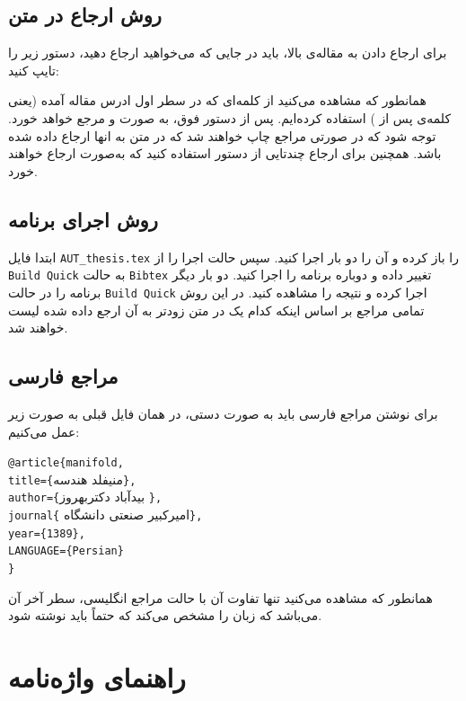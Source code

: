 \subsection{روش ارجاع در متن}
برای ارجاع دادن به مقاله‌ی بالا، باید در جایی که می‌خواهید ارجاع دهید، دستور زیر را تایپ کنید:
\begin{latin}
\end{latin}
همانطور که مشاهده می‌کنید از کلمه‌ای که در سطر اول ادرس مقاله آمده (یعنی کلمه‌ی پس از
)
استفاده کرده‌ایم. پس از دستور فوق، به صورت \cite{bidabad2007classification} و \cite{aa} مرجع خواهد خورد. توجه شود که در صورتی مراجع چاپ خواهند شد که در متن به انها ارجاع داده شده باشد. همچنین برای ارجاع چندتایی از دستور 
استفاده کنید که به‌صورت \cite{najafi2008finsler, zakeri, najafi} ارجاع خواهند خورد.
\subsection{روش اجرای برنامه}
ابتدا فایل
\verb;AUT_thesis.tex;
را باز کرده و آن را دو بار اجرا کنید. سپس حالت اجرا را از 
\verb;Build Quick;
به حالت
\verb;Bibtex;
تغییر داده و دوباره برنامه را اجرا کنید. دو بار دیگر برنامه را در حالت 
\verb;Build Quick;
اجرا کرده و نتیجه را مشاهده کنید. در این روش تمامی مراجع بر اساس اینکه کدام یک در متن زودتر به آن ارجع داده شده لیست خواهند شد.
\subsection{مراجع فارسی}
برای نوشتن مراجع فارسی باید به صورت دستی، در همان فایل قبلی به صورت زیر عمل می‌کنیم:
\begin{LTR}
\noindent\verb;@article{manifold,;\\
\verb;title={;منیفلد هندسه\verb;},;\\
\verb;author={;بیدآباد دکتربهروز \verb;},;\\
\verb;journal{; امیرکبیر صنعتی دانشگاه\verb;},;\\
\verb;year={1389},;\\
\verb;LANGUAGE={Persian};\\
\verb;};
\end{LTR}
همانطور که مشاهده می‌کنید تنها تفاوت آن با حالت مراجع انگلیسی، سطر آخر آن می‌باشد که زبان را مشخص می‌کند که حتماً باید نوشته شود.
\section{راهنمای واژه‌نامه}

